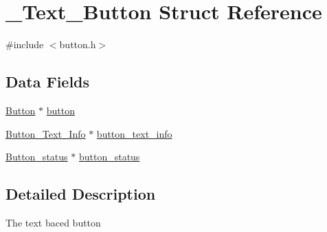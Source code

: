 \hypertarget{struct___text___button}{\section{\+\_\+\+Text\+\_\+\+Button Struct Reference}
\label{struct___text___button}
}


{\ttfamily \#include $<$button.\+h$>$}

\subsection*{Data Fields}
\begin{DoxyCompactItemize}
\item 
\hyperlink{button_8h_a7ac808241c1224e4caaee5a00ef0b231}{Button} $\ast$ \hyperlink{struct___text___button_afcbb5b54142bac4e305b31cbebe41064}{button}
\item 
\hyperlink{button_8h_a499e0a58eb6474c85546877dc1ce03e4}{Button\+\_\+\+Text\+\_\+\+Info} $\ast$ \hyperlink{struct___text___button_ab64035e509bab4503a5e1798bcd3d94f}{button\+\_\+text\+\_\+info}
\item 
\hyperlink{button_8h_a380cba32ff506aefafa5ce913c2c972c}{Button\+\_\+status} $\ast$ \hyperlink{struct___text___button_af1ab6c7287e67a55a8e855e08302f8be}{button\+\_\+status}
\end{DoxyCompactItemize}


\subsection{Detailed Description}
The text baced button 

